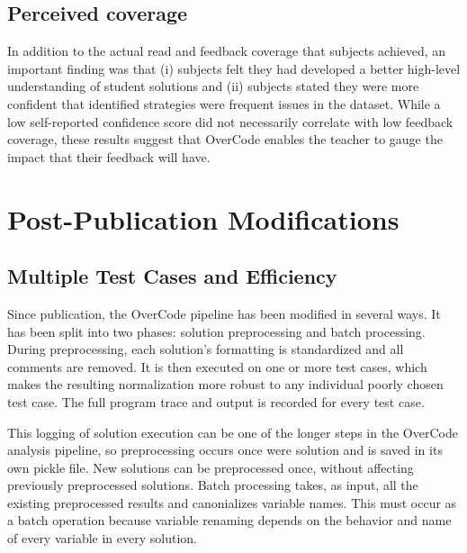 \subsection{Perceived coverage}
In addition to the actual read and feedback coverage that subjects achieved, an important finding was that (i) subjects felt they had developed a better high-level understanding of student solutions and (ii) subjects stated they were more confident that identified strategies were frequent issues in the dataset. While a low self-reported confidence score did not necessarily correlate with low feedback coverage, these results suggest that OverCode enables the teacher to gauge the impact that their feedback will have.

\section{Post-Publication Modifications}


\subsection{Multiple Test Cases and Efficiency} 
Since publication, the OverCode pipeline has been modified in several ways. It has been split into two phases: solution preprocessing and batch processing. During preprocessing, each solution's formatting is standardized and all comments are removed. It is then executed on one or more test cases, which makes the resulting normalization more robust to any individual poorly chosen test case. The full program trace and output is recorded for every test case. 

This logging of solution execution can be one of the longer steps in the OverCode analysis pipeline, so preprocessing occurs once were solution and is saved in its own pickle file. New solutions can be preprocessed once, without affecting previously preprocessed solutions. Batch processing takes, as input, all the existing preprocessed results and canonializes variable names. This must occur as a batch operation because variable renaming depends on the behavior and name of every variable in every solution.

